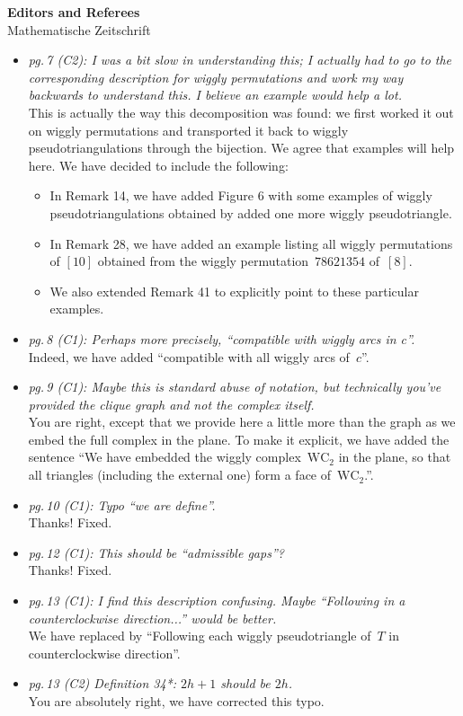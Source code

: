 \documentclass{letter}
\begin{document}
\begin{letter}{{\bf Editors and Referees} \\ Mathematische Zeitschrift}
\begin{itemize}
\item \textsl{\color{gray} pg.\,7 (C2): I was a bit slow in understanding this; I actually had to go to the corresponding description for wiggly permutations and work my way backwards to understand this. I believe an example would help a lot.} \\
This is actually the way this decomposition was found: we first worked it out on wiggly permutations and transported it back to wiggly pseudotriangulations through the bijection.
We agree that examples will help here. We have decided to include the following:
\begin{itemize}
\item In Remark 14, we have added Figure 6 with some examples of wiggly pseudotriangulations obtained by added one more wiggly pseudotriangle.
\item In Remark 28, we have added an example listing all wiggly permutations of $[10]$ obtained from the wiggly permutation~$78621354$ of~$[8]$.
\item We also extended Remark 41 to explicitly point to these particular examples.
\end{itemize}

\item \textsl{\color{gray} pg.\,8 (C1): Perhaps more precisely, “compatible with wiggly arcs in c”.} \\
Indeed, we have added ``compatible with all wiggly arcs of~$c$''.

\item \textsl{\color{gray} pg.\,9 (C1): Maybe this is standard abuse of notation, but technically you’ve provided the clique graph and not the complex itself.} \\
You are right, except that we provide here a little more than the graph as we embed the full complex in the plane. To make it explicit, we have added the sentence ``We have embedded the wiggly complex~$\mathrm{WC}_2$ in the plane, so that all triangles (including the external one) form a face of~$\mathrm{WC}_2$.''.

\item \textsl{\color{gray} pg.\,10 (C1): Typo ``we are define''.} \\
Thanks! Fixed.

\item \textsl{\color{gray} pg.\,12 (C1): This should be ``admissible gaps''?} \\
Thanks! Fixed.

\item \textsl{\color{gray} pg.\,13 (C1): I find this description confusing. Maybe ``Following in a counterclockwise direction...'' would be better.} \\
We have replaced by ``Following each wiggly pseudotriangle of~$T$ in counterclockwise direction''.
\item \textsl{\color{gray} pg.\,13 (C2) Definition 34*: $2h + 1$ should be $2h$.} \\
You are absolutely right, we have corrected this typo.


\end{itemize}
\end{letter}
\end{document}
